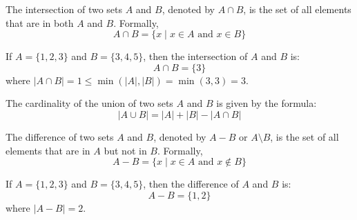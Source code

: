 \begin{definition}[Intersection]
    The intersection of two sets $A$ and $B$, denoted by $A \cap B$, is the set of all elements that are in both $A$ and $B$. Formally,
    \[ A \cap B = \{x \mid x \in A \text{ and } x \in B\} \]
    \begin{center}
    \end{center}
\end{definition}
\begin{eg}
    If $A = \{1, 2, 3\}$ and $B = \{3, 4, 5\}$, then the intersection of $A$ and $B$ is:
    \[ A \cap B = \{3\} \]
    where $|A \cap B| = 1 \leq \min(|A|, |B|) = \min(3, 3) = 3$.
\end{eg}
\begin{definition}
    The cardinality of the union of two sets $A$ and $B$ is given by the formula:
    \[ |A \cup B| = |A| + |B| - |A \cap B| \]
\end{definition}
\begin{definition}[Difference]
    The difference of two sets $A$ and $B$, denoted by $A - B$ or $A \setminus B$, is the set of all elements that are in $A$ but not in $B$. Formally,
    \[ A - B = \{x \mid x \in A \text{ and } x \notin B\} \]
    \begin{center}
    \end{center}
\end{definition}
\begin{eg}
    If $A = \{1, 2, 3\}$ and $B = \{3, 4, 5\}$, then the difference of $A$ and $B$ is:
    \[ A - B = \{1, 2\} \]
    where $|A - B| = 2$.
\end{eg}

